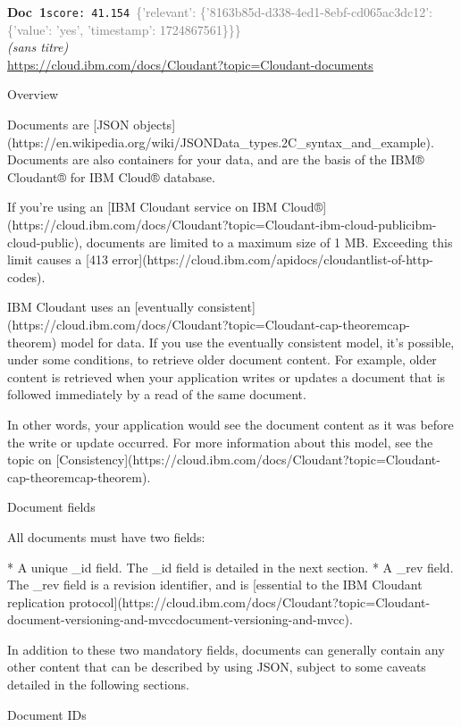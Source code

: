 \documentclass[a4paper,11pt]{article}
\begin{document}
\begin{docenv}
{\footnotesize\textcolor{doccolor}{\textbf{Doc~1}}}\hfill{\tiny\texttt{score:~41.154}}\ {\tiny\textcolor{gray}{\{'relevant': \{'8163b85d-d338-4ed1-8ebf-cd065ac3dc12': \{'value': 'yes', 'timestamp': 1724867561\}\}\}}}\\[3pt]
{\small\textit{(sans titre)}}\\[2pt]
{\tiny\url{https://cloud.ibm.com/docs/Cloudant?topic=Cloudant-documents}}\\[4pt]
{\footnotesize 
Overview 

Documents are [JSON objects](https://en.wikipedia.org/wiki/JSONData\_types.2C\_syntax\_and\_example). Documents are also containers for your data, and are the basis of the IBM® Cloudant® for IBM Cloud® database.

If you're using an [IBM Cloudant service on IBM Cloud®](https://cloud.ibm.com/docs/Cloudant?topic=Cloudant-ibm-cloud-publicibm-cloud-public), documents are limited to a maximum size of 1 MB. Exceeding this limit causes a [413 error](https://cloud.ibm.com/apidocs/cloudantlist-of-http-codes).

IBM Cloudant uses an [eventually consistent](https://cloud.ibm.com/docs/Cloudant?topic=Cloudant-cap-theoremcap-theorem) model for data. If you use the eventually consistent model, it's possible, under some conditions, to retrieve older document content. For example, older content is retrieved when your application writes or updates a document that is followed immediately by a read of the same document.

In other words, your application would see the document content as it was before the write or update occurred. For more information about this model, see the topic on [Consistency](https://cloud.ibm.com/docs/Cloudant?topic=Cloudant-cap-theoremcap-theorem).



 Document fields 

All documents must have two fields:



* A unique \_id field. The \_id field is detailed in the next section.
* A \_rev field. The \_rev field is a revision identifier, and is [essential to the IBM Cloudant replication protocol](https://cloud.ibm.com/docs/Cloudant?topic=Cloudant-document-versioning-and-mvccdocument-versioning-and-mvcc).



In addition to these two mandatory fields, documents can generally contain any other content that can be described by using JSON, subject to some caveats detailed in the following sections.



 Document IDs}
\end{docenv}
\end{document}
